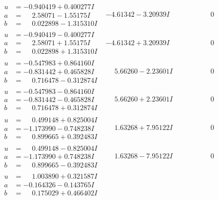 \documentclass[1p]{elsarticle_modified}
\theoremstyle{definition}
\begin{document}
$$\begin{array}{c|c|c}
\begin{aligned}
u &= -0.940419 + 0.400277 I \\
a &= \phantom{-}2.58071 - 1.55175 I \\
b &= \phantom{-}0.022898 - 1.315310 I\end{aligned}
 & -4.61342 - 3.20939 I & \phantom{-0.000000 } 0 \\ \hline\begin{aligned}
u &= -0.940419 - 0.400277 I \\
a &= \phantom{-}2.58071 + 1.55175 I \\
b &= \phantom{-}0.022898 + 1.315310 I\end{aligned}
 & -4.61342 + 3.20939 I & \phantom{-0.000000 } 0 \\ \hline\begin{aligned}
u &= -0.547983 + 0.864160 I \\
a &= -0.831442 + 0.465828 I \\
b &= \phantom{-}0.716478 - 0.312874 I\end{aligned}
 & \phantom{-}5.66260 - 2.23601 I & \phantom{-0.000000 } 0 \\ \hline\begin{aligned}
u &= -0.547983 - 0.864160 I \\
a &= -0.831442 - 0.465828 I \\
b &= \phantom{-}0.716478 + 0.312874 I\end{aligned}
 & \phantom{-}5.66260 + 2.23601 I & \phantom{-0.000000 } 0 \\ \hline\begin{aligned}
u &= \phantom{-}0.499148 + 0.825004 I \\
a &= -1.173990 - 0.748238 I \\
b &= \phantom{-}0.899665 + 0.392483 I\end{aligned}
 & \phantom{-}1.63268 + 7.95122 I & \phantom{-0.000000 } 0 \\ \hline\begin{aligned}
u &= \phantom{-}0.499148 - 0.825004 I \\
a &= -1.173990 + 0.748238 I \\
b &= \phantom{-}0.899665 - 0.392483 I\end{aligned}
 & \phantom{-}1.63268 - 7.95122 I & \phantom{-0.000000 } 0 \\ \hline\begin{aligned}
u &= \phantom{-}1.003890 + 0.321587 I \\
a &= -0.164326 - 0.143765 I \\
b &= \phantom{-}0.175029 + 0.466402 I\end{aligned}

\end{array}$$
\end{document}
